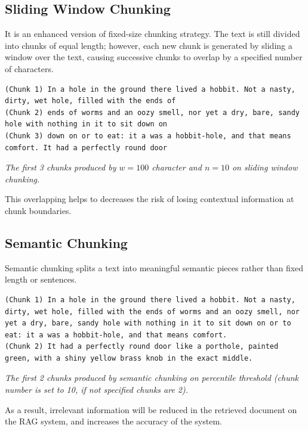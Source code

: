 \documentclass[conference]{IEEEtran}
\begin{document}
\subsection{Sliding Window Chunking}
It is an enhanced version of fixed-size chunking strategy. The text is still divided into chunks of equal length; however, each new chunk is generated by sliding a window over the text, causing successive chunks to overlap by a specified number of characters.
\footnotesize
\begin{tcolorbox}[colback=gray!15, colframe=gray!75, arc=8mm]
\begin{lstlisting}[breaklines=true, columns=fullflexible]
(Chunk 1) In a hole in the ground there lived a hobbit. Not a nasty, dirty, wet hole, filled with the ends of
(Chunk 2) ends of worms and an oozy smell, nor yet a dry, bare, sandy hole with nothing in it to sit down on
(Chunk 3) down on or to eat: it a was a hobbit-hole, and that means comfort. It had a perfectly round door
\end{lstlisting}
\end{tcolorbox}
\begin{center}
\textit{The first 3 chunks produced by $w=100$ character and $n=10$ on sliding window chunking.}
\end{center}
\normalsize
 This overlapping helps to decreases the risk of losing contextual information at chunk boundaries.

\subsection{Semantic Chunking}
Semantic chunking splits a text into meaningful semantic pieces rather than fixed length or sentences.
\footnotesize
\begin{tcolorbox}[colback=gray!15, colframe=gray!75, arc=8mm]
\begin{lstlisting}[breaklines=true, columns=fullflexible]
(Chunk 1) In a hole in the ground there lived a hobbit. Not a nasty, dirty, wet hole, filled with the ends of worms and an oozy smell, nor yet a dry, bare, sandy hole with nothing in it to sit down on or to eat: it a was a hobbit-hole, and that means comfort.
(Chunk 2) It had a perfectly round door like a porthole, painted green, with a shiny yellow brass knob in the exact middle.
\end{lstlisting}
\end{tcolorbox}
\begin{center}
\textit{The first 2 chunks produced by semantic chunking on percentile threshold (chunk number is set to 10, if not specified chunks are 2).}
\end{center}
\normalsize
 As a result, irrelevant information will be reduced in the retrieved document on the RAG system, and increases the accuracy of the system.
\end{document}
